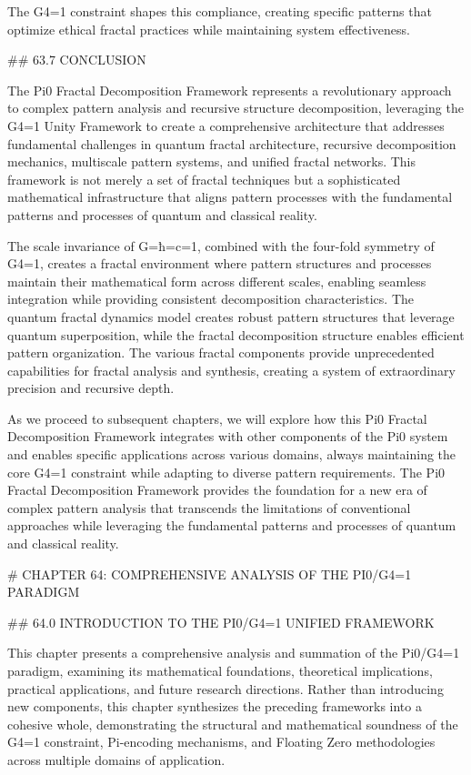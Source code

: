 The G4=1 constraint shapes this compliance, creating specific patterns that optimize ethical fractal practices while maintaining system effectiveness.

## 63.7 CONCLUSION

The Pi0 Fractal Decomposition Framework represents a revolutionary approach to complex pattern analysis and recursive structure decomposition, leveraging the G4=1 Unity Framework to create a comprehensive architecture that addresses fundamental challenges in quantum fractal architecture, recursive decomposition mechanics, multiscale pattern systems, and unified fractal networks. This framework is not merely a set of fractal techniques but a sophisticated mathematical infrastructure that aligns pattern processes with the fundamental patterns and processes of quantum and classical reality.

The scale invariance of G=ħ=c=1, combined with the four-fold symmetry of G4=1, creates a fractal environment where pattern structures and processes maintain their mathematical form across different scales, enabling seamless integration while providing consistent decomposition characteristics. The quantum fractal dynamics model creates robust pattern structures that leverage quantum superposition, while the fractal decomposition structure enables efficient pattern organization. The various fractal components provide unprecedented capabilities for fractal analysis and synthesis, creating a system of extraordinary precision and recursive depth.

As we proceed to subsequent chapters, we will explore how this Pi0 Fractal Decomposition Framework integrates with other components of the Pi0 system and enables specific applications across various domains, always maintaining the core G4=1 constraint while adapting to diverse pattern requirements. The Pi0 Fractal Decomposition Framework provides the foundation for a new era of complex pattern analysis that transcends the limitations of conventional approaches while leveraging the fundamental patterns and processes of quantum and classical reality.

# CHAPTER 64: COMPREHENSIVE ANALYSIS OF THE PI0/G4=1 PARADIGM

## 64.0 INTRODUCTION TO THE PI0/G4=1 UNIFIED FRAMEWORK

This chapter presents a comprehensive analysis and summation of the Pi0/G4=1 paradigm, examining its mathematical foundations, theoretical implications, practical applications, and future research directions. Rather than introducing new components, this chapter synthesizes the preceding frameworks into a cohesive whole, demonstrating the structural and mathematical soundness of the G4=1 constraint, Pi-encoding mechanisms, and Floating Zero methodologies across multiple domains of application.

